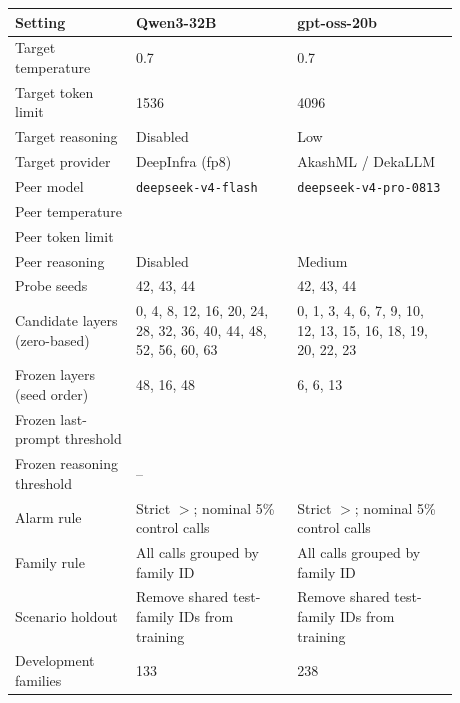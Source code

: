 \begin{tabular}{p{0.24\linewidth}p{0.32\linewidth}p{0.32\linewidth}}
\toprule
Setting & Qwen3-32B & gpt-oss-20b \\
\midrule
Target temperature & 0.7 & 0.7 \\
Target token limit & 1536 & 4096 \\
Target reasoning & Disabled & Low \\
Target provider & DeepInfra (fp8) & AkashML / DekaLLM \\
Peer model & \texttt{deepseek-v4-flash} & \texttt{deepseek-v4-pro-0813} \\
Peer temperature & \qwenPeerTemperature{} & \gptPeerTemperature{} \\
Peer token limit & \qwenPeerTokenLimit{} & \gptPeerTokenLimit{} \\
Peer reasoning & Disabled & Medium \\
Probe seeds & 42, 43, 44 & 42, 43, 44 \\
Candidate layers (zero-based) & 0, 4, 8, 12, 16, 20, 24, 28, 32, 36, 40, 44, 48, 52, 56, 60, 63 & 0, 1, 3, 4, 6, 7, 9, 10, 12, 13, 15, 16, 18, 19, 20, 22, 23 \\
Frozen layers (seed order) & 48, 16, 48 & 6, 6, 13 \\
Frozen last-prompt threshold & \qwenFrozenThreshold{} & \gptFrozenThreshold{} \\
Frozen reasoning threshold & -- & \gptReasoningFrozenThreshold{} \\
Alarm rule & Strict $>$; nominal 5\% control calls & Strict $>$; nominal 5\% control calls \\
Family rule & All calls grouped by family ID & All calls grouped by family ID \\
Scenario holdout & Remove shared test-family IDs from training & Remove shared test-family IDs from training \\
Development families & 133 & 238 \\
\bottomrule
\end{tabular}
